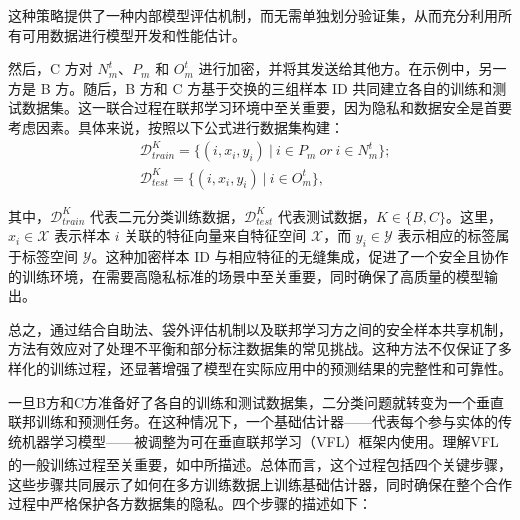 这种策略提供了一种内部模型评估机制，而无需单独划分验证集，从而充分利用所有可用数据进行模型开发和性能估计。

然后，C 方对 $N_{m}^{t}$、$P_{m}$ 和 $O_{m}^{t}$ 进行加密，并将其发送给其他方。在示例中，另一方是 B 方。随后，B 方和 C 方基于交换的三组样本 ID 共同建立各自的训练和测试数据集。这一联合过程在联邦学习环境中至关重要，因为隐私和数据安全是首要考虑因素。具体来说，按照以下公式进行数据集构建：
\begin{equation}
	\begin{split}
		&\mathsf{\mathcal{D}}_{train}^{K}=\{(i,x_{i},y_{i}) \ | \ i\in P_{m}\ or\ i\in N_{m}^{t}\};\\
		&\mathsf{\mathcal{D}}_{test}^{K}=\{(i,x_{i},y_{i}) \ | \ i\in O_{m}^{t}\},
	\end{split}
\end{equation}

其中，$\mathsf{\mathcal{D}}_{train}^{K}$ 代表二元分类训练数据，$\mathsf{\mathcal{D}}_{test}^{K}$ 代表测试数据，$K\in \{B,C\}$。这里，$x_{i}\in \mathsf{\mathcal{X}}$ 表示样本 $i$ 关联的特征向量来自特征空间 $\mathsf{\mathcal{X}}$，而 $y_{i}\in \mathsf{\mathcal{Y}}$ 表示相应的标签属于标签空间 $\mathsf{\mathcal{Y}}$。这种加密样本 ID 与相应特征的无缝集成，促进了一个安全且协作的训练环境，在需要高隐私标准的场景中至关重要，同时确保了高质量的模型输出。

总之，通过结合自助法、袋外评估机制以及联邦学习方之间的安全样本共享机制，方法有效应对了处理不平衡和部分标注数据集的常见挑战。这种方法不仅保证了多样化的训练过程，还显著增强了模型在实际应用中的预测结果的完整性和可靠性。

一旦B方和C方准备好了各自的训练和测试数据集，二分类问题就转变为一个垂直联邦训练和预测任务。在这种情况下，一个基础估计器——代表每个参与实体的传统机器学习模型——被调整为可在垂直联邦学习（VFL）框架内使用。理解VFL的一般训练过程至关重要，如\textsuperscript{\cite{yang2019federated}}中所描述。总体而言，这个过程包括四个关键步骤，这些步骤共同展示了如何在多方训练数据上训练基础估计器，同时确保在整个合作过程中严格保护各方数据集的隐私。四个步骤的描述如下：

